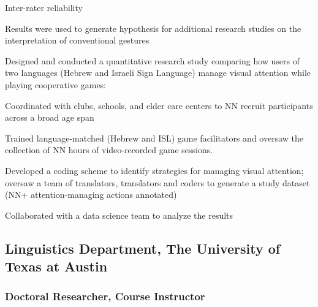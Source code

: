 \documentclass[11pt, oneside]{memoir}
\newcommand{\position}[2]{
     \subsubsection{#1\hfill\mdseries{#2}}}
\begin{document}
Inter-rater reliability

Results were used to generate hypothesis for additional research studies on the interpretation of conventional gestures



Designed and conducted a quantitative research study comparing how users of two languages (Hebrew and Israeli Sign Language) manage visual attention while playing cooperative games: 

Coordinated with clubs, schools, and elder care centers to NN recruit participants across a broad age span 

Trained language-matched (Hebrew and ISL) game facilitators and oversaw the collection of NN hours of video-recorded game sessions.

Developed a coding scheme to identify strategies for managing visual attention; oversaw a team of translators, translators and coders to generate a study dataset (NN+ attention-managing actions annotated)

Collaborated with a data science team to analyze the results  

\subsection{Linguistics Department, The University of Texas at Austin}
\position{Doctoral Researcher, Course Instructor}{2011--2017}


 
\end{document}
